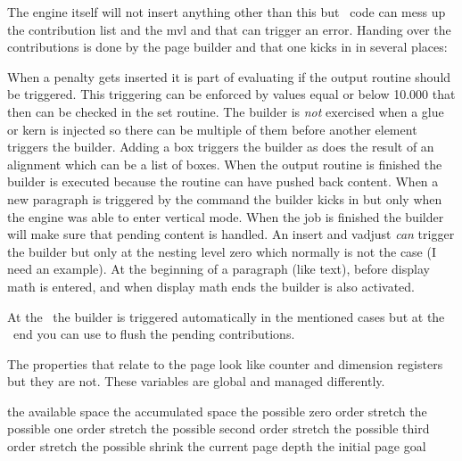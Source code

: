 The engine itself will not insert anything other than this but \LUA\ code can
mess up the contribution list and the mvl and that can trigger an error. Handing
over the contributions is done by the page builder and that one kicks in in
several places:

\startitemize[packed]
\startitem
    When a penalty gets inserted it is part of evaluating if the output routine
    should be triggered. This triggering can be enforced by values equal or below
    10.000 that then can be checked in the set routine.
\stopitem
\startitem
    The builder is {\em not} exercised when a glue or kern is injected so there can
    be multiple of them before another element triggers the builder.
\stopitem
\startitem
    Adding a box triggers the builder as does the result of an alignment which can
    be a list of boxes.
\stopitem
\startitem
    When the output routine is finished the builder is executed because the
    routine can have pushed back content.
\stopitem
\startitem
    When a new paragraph is triggered by the \type {\par} command the builder kicks in
    but only when the engine was able to enter vertical mode.
\stopitem
\startitem
    When the job is finished the builder will make sure that pending content is handled.
\stopitem
\startitem
    An insert and vadjust {\em can} trigger the builder but only at the nesting level zero
    which normally is not the case (I need an example).
\stopitem
\startitem
    At the beginning of a paragraph (like text), before display math is entered,
    and when display math ends the builder is also activated.
\stopitem
\stopitemize

At the \TEX\ the builder is triggered automatically in the mentioned cases but at
the \LUA\ end you can use  to flush the pending
contributions.

The properties that relate to the page look like counter and dimension registers
but they are not. These variables are global and managed differently.

\starttabulate
\NC \type {\pagegoal}         \NC the available space \NC \NR
\NC \type {\pagetotal}        \NC the accumulated space \NC \NR
\NC \type {\pagestretch}      \NC the possible zero order stretch \NC \NR
\NC \type {\pagefilstretch}   \NC the possible one order stretch \NC \NR
\NC \type {\pagefillstretch}  \NC the possible second order stretch \NC \NR
\NC \type {\pagefilllstretch} \NC the possible third order stretch \NC \NR
\NC \type {\pageshrink}       \NC the possible shrink \NC \NR
\NC \type {\pagedepth}        \NC the current page depth \NC \NR
\NC \type {\pagevsize}        \NC the initial page goal \NC \NR
\stoptabulate

